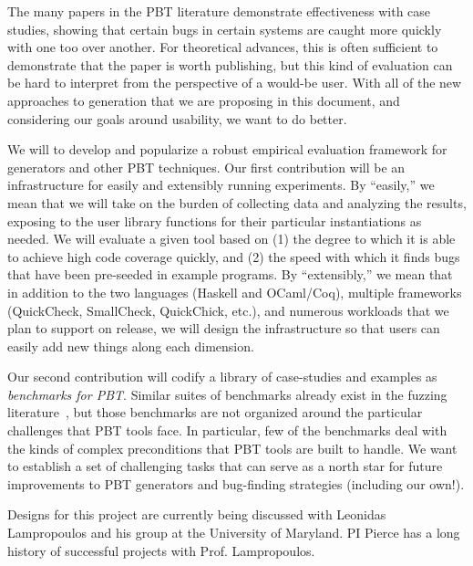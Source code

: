 The many papers in the PBT literature demonstrate effectiveness with case
studies, showing that certain bugs in certain systems are caught more quickly
with one too over another. For theoretical advances, this is often sufficient
to demonstrate that the paper is worth publishing, but this kind of evaluation
can be hard to interpret from the perspective of a would-be user. With all of
the new approaches to generation that we are proposing in this document, and
considering our goals around usability, we want to do better.

We will to develop and popularize a robust empirical evaluation framework for
generators and other PBT techniques. Our first contribution will be an
infrastructure for easily and extensibly running experiments.  By ``easily,'' we
mean that we will take on the burden of collecting data and analyzing the
results, exposing to the user library functions for their particular
instantiations as needed. We will evaluate a given tool based on (1) the degree
to which it is able to achieve high code coverage quickly, and (2) the speed
with which it finds bugs that have been pre-seeded in example programs. By
``extensibly,'' we mean that in addition to the two languages (Haskell and
OCaml/Coq), multiple frameworks (QuickCheck, SmallCheck, QuickChick, etc.), and
numerous workloads that we plan to support on release, we will design the
infrastructure so that users can easily add new things along each dimension.

Our second contribution will codify a library of case-studies and examples as
{\em benchmarks for PBT}. Similar suites of benchmarks already exist in the
fuzzing literature~\cite{hazimeh_magma_2021}, but those benchmarks are not
organized around the particular challenges that PBT tools face. In particular,
few of the benchmarks deal with the kinds of complex preconditions that PBT
tools are built to handle. We want to establish a set of challenging tasks that
can serve as a north star for future improvements to PBT generators and
bug-finding strategies (including our own!).

Designs for this project are currently being discussed with Leonidas
Lampropoulos and his group at the University of Maryland. PI Pierce has a long
history of successful projects with Prof. Lampropoulos. 


